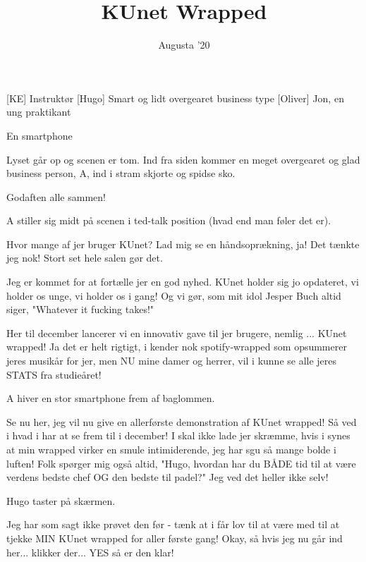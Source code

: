 \documentclass[a4paper,11pt]{article}
\title{KUnet Wrapped}
\author{Augusta '20}
\begin{document}
\maketitle

\begin{roles}
[KE] Instruktør
[Hugo] Smart og lidt overgearet business type
[Oliver] Jon, en ung praktikant 
\end{roles}

\begin{props}
 En smartphone
\end{props}

\begin{sketch}

\scene Lyset går op og scenen er tom. Ind fra siden kommer en meget overgearet og glad business person, A, ind i stram skjorte og spidse sko. 

 Godaften alle sammen! 

\scene A stiller sig midt på scenen i ted-talk position (hvad end man føler det er). 

 Hvor mange af jer bruger KUnet? Lad mig se en håndsoprækning, ja! Det tænkte jeg nok! Stort set hele salen gør det. 


 Jeg er kommet for at fortælle jer en god nyhed. KUnet holder sig jo opdateret, vi holder os unge, vi holder os i gang! Og vi gør, som mit idol Jesper Buch altid siger, "Whatever it fucking takes!"

 Her til december lancerer vi en innovativ gave til jer brugere, nemlig ...  KUnet wrapped! Ja det er helt rigtigt, i kender nok spotify-wrapped som opsummerer jeres musikår for jer, men NU mine damer og herrer, vil i kunne se alle jeres STATS fra studieåret!

\scene A hiver en stor smartphone frem af baglommen. 


 Se nu her, jeg vil nu give en allerførste demonstration af KUnet wrapped! Så ved i hvad i har at se frem til i december! I skal ikke lade jer skræmme, hvis i synes at min wrapped virker en smule intimiderende, jeg har sgu så mange bolde i luften! Folk spørger mig også altid, "Hugo, hvordan har du BÅDE tid til at være verdens bedste chef OG den bedste til padel?" Jeg ved det heller ikke selv! 

\scene Hugo taster på skærmen. 

 Jeg har som sagt ikke prøvet den før - tænk at i får lov til at være med til at tjekke MIN KUnet wrapped for aller første gang! Okay, så hvis jeg nu går ind her... klikker der... YES så er den klar! 


\end{sketch}
\end{document}
